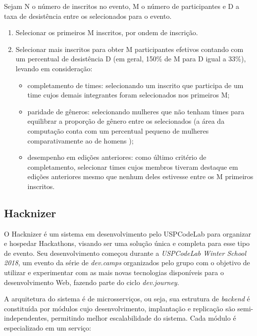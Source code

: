 \documentclass[10pt,twoside,a4paper]{article}
\begin{document}
    
Sejam N o número de inscritos no evento, M o número de participantes e D a taxa de desistência entre os selecionados para o evento.
    
    \begin{enumerate}
      \item Selecionar os primeiros M inscritos, por ondem de inscrição.
     
      \item Selecionar mais inscritos para obter M participantes efetivos contando com um percentual de desistência D (em geral, 150\% de M para D igual a 33\%), levando em consideração: 
      
      \begin{itemize}
          \item completamento de times: selecionando um inscrito que participa de um time cujos demais integrantes foram selecionados nos primeiros M;
          \item paridade de gêneros: selecionando mulheres que não tenham times para equilibrar a proporção de gênero entre os selecionados (a área da computação conta com um percentual pequeno de mulheres comparativamente ao de homens \cite{Frenkel1990WomenComputing});
          \item desempenho em edições anteriores: como último critério de completamento, selecionar times cujos membros tiveram destaque em edições anteriores mesmo que nenhum deles estivesse entre os M primeiros inscritos.
      \end{itemize}   
    \end{enumerate}
    
  \subsection{Hacknizer}

    O Hacknizer é um sistema em desenvolvimento pelo USPCodeLab para organizar e hospedar Hackathons, visando ser uma solução única e completa para esse tipo de evento. Seu desenvolvimento começou durante a \textit{USPCodeLab Winter School 2018}, um evento da série de \textit{dev.camps} organizados pelo grupo com o objetivo de utilizar e experimentar com as mais novas tecnologias disponíveis para o desenvolvimento Web, fazendo parte do ciclo \textit{dev.journey}.
    
    A arquitetura do sistema é de microsserviços, ou seja, sua estrutura de \textit{backend} é constituída por módulos cujo desenvolvimento, implantação e replicação são semi-independentes, permitindo melhor escalabilidade do sistema. Cada módulo é especializado em um serviço:
    
\end{document}

